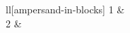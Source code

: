 \documentclass{article}\usepackage{nicematrix}
\begin{document}
\begin{NiceTabular}{ll}[ampersand-in-blocks]
1 &  \\
2 &  \\
\end{NiceTabular}
\end{document}
